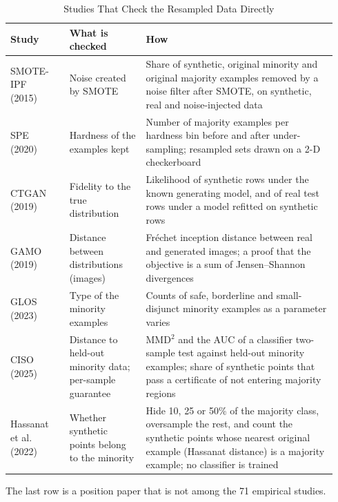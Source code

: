 \begin{table}[t]
  \caption{Studies That Check the Resampled Data Directly}
  \label{tab:empirical-direct}
  \footnotesize
  \setlength{\tabcolsep}{4pt}
  \begin{tabular}{@{}p{0.17\linewidth}p{0.22\linewidth}p{0.55\linewidth}@{}}
    \toprule
    Study & What is checked & How\\
    \midrule
    SMOTE-IPF (2015)~\parencite{saez2015smoteipf} & Noise created by SMOTE & Share of synthetic, original minority and original majority examples removed by a noise filter after SMOTE, on synthetic, real and noise-injected data\\
    SPE (2020)~\parencite{liu2020spe} & Hardness of the examples kept & Number of majority examples per hardness bin before and after under-sampling; resampled sets drawn on a 2-D checkerboard\\
    CTGAN (2019)~\parencite{xu2019ctgan} & Fidelity to the true distribution & Likelihood of synthetic rows under the known generating model, and of real test rows under a model refitted on synthetic rows\\
    GAMO (2019)~\parencite{mullick2019gamo} & Distance between distributions (images) & Fréchet inception distance between real and generated images; a proof that the objective is a sum of Jensen--Shannon divergences\\
    GLOS (2023)~\parencite{han2023glos} & Type of the minority examples & Counts of safe, borderline and small-disjunct minority examples as a parameter varies\\
    CISO (2025)~\parencite{yadav2025ciso} & Distance to held-out minority data; per-sample guarantee & MMD$^2$ and the AUC of a classifier two-sample test against held-out minority examples; share of synthetic points that pass a certificate of not entering majority regions\\
    \midrule
    Hassanat et al. (2022)~\parencite{hassanat2022stop} & Whether synthetic points belong to the minority & Hide 10, 25 or 50\% of the majority class, oversample the rest, and count the synthetic points whose nearest original example (Hassanat distance) is a majority example; no classifier is trained\\
    \bottomrule
  \end{tabular}
  \par\smallskip\raggedright\scriptsize The last row is a position paper that is not among the 71 empirical studies.
\end{table}
